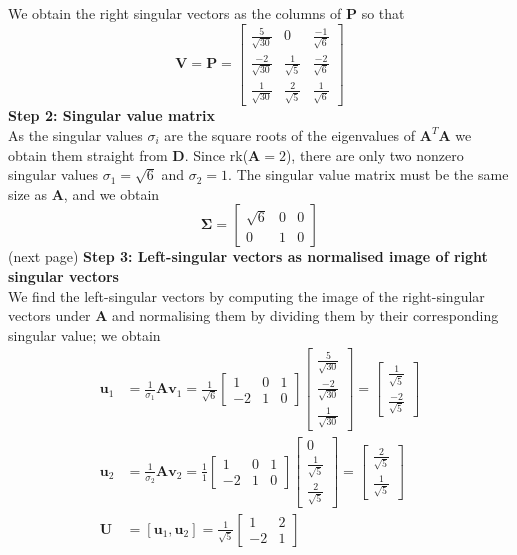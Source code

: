\documentclass{report}
\begin{document}
We obtain the right singular vectors as the columns of $\bm{P}$ so that
\begin{equation*}
\bm{V}=\bm{P}=\begin{bmatrix}
\frac{5}{\sqrt{30}}&0&\frac{-1}{\sqrt{6}}\\
\frac{-2}{\sqrt{30}}&\frac{1}{\sqrt{5}}&\frac{-2}{\sqrt{6}}\\
\frac{1}{\sqrt{30}}&\frac{2}{\sqrt{5}}&\frac{1}{\sqrt{6}}
\end{bmatrix}
\end{equation*}
\textbf{Step 2: Singular value matrix}\\
As the singular values $\sigma_i$ are the square roots of the eigenvalues of 
$\bm{A}^T\bm{A}$ we obtain them straight from $\bm{D}$.
Since rk($\bm{A}=2$), there are only two nonzero singular values $\sigma_1=\sqrt{6}$ and $\sigma_2=1$.
The singular value matrix must be the same size as $\bm{A}$, and we obtain
\begin{equation*}
\bm{\Sigma}=\begin{bmatrix}
\sqrt{6}&0&0\\0&1&0
\end{bmatrix}
\end{equation*}
(next page)
\newpage
\noindent\textbf{Step 3: Left-singular vectors as normalised image of right singular vectors}\\
We find the left-singular vectors by computing the image of the right-singular vectors under $\bm{A}$ and
normalising them by dividing them by their corresponding singular value; we obtain
\begin{align*}
\bm{u}_1&=\frac{1}{\sigma_1}\bm{Av}_1=\frac{1}{\sqrt{6}}
\begin{bmatrix}1&0&1\\
-2&1&0\end{bmatrix}\begin{bmatrix}
\frac{5}{\sqrt{30}}\\\frac{-2}{\sqrt{30}}\\\frac{1}{\sqrt{30}}
\end{bmatrix}=\begin{bmatrix}
\frac{1}{\sqrt{5}}\\\frac{-2}{\sqrt{5}}\end{bmatrix}\\
\bm{u}_2&=\frac{1}{\sigma_2}\bm{Av}_2=\frac{1}{1}
\begin{bmatrix}1&0&1\\
-2&1&0\end{bmatrix}\begin{bmatrix}
0\\\frac{1}{\sqrt{5}}\\\frac{2}{\sqrt{5}}\end{bmatrix}
=\begin{bmatrix}
\frac{2}{\sqrt{5}}\\\frac{1}{\sqrt{5}}\end{bmatrix}\\
\bm{U}&=[\bm{u}_1,\bm{u}_2]=\frac{1}{\sqrt{5}}
\begin{bmatrix}1&2\\-2&1\end{bmatrix}
\end{align*}
\end{document}
